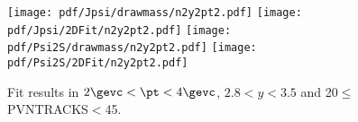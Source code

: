 \begin{figure}[H]
\begin{center}
\texttt{[image: pdf/Jpsi/drawmass/n2y2pt2.pdf]}
\texttt{[image: pdf/Jpsi/2DFit/n2y2pt2.pdf]}
\vspace*{-0.5cm}
\texttt{[image: pdf/Psi2S/drawmass/n2y2pt2.pdf]}
\texttt{[image: pdf/Psi2S/2DFit/n2y2pt2.pdf]}
\vspace*{-0.5cm}
\end{center}
\caption{Fit results in $2\gevc<\pt<4\gevc$, $2.8<y<3.5$ and 20$\leq$PVNTRACKS$<$45.}
\label{Fitn2y2pt2}
\end{figure}

